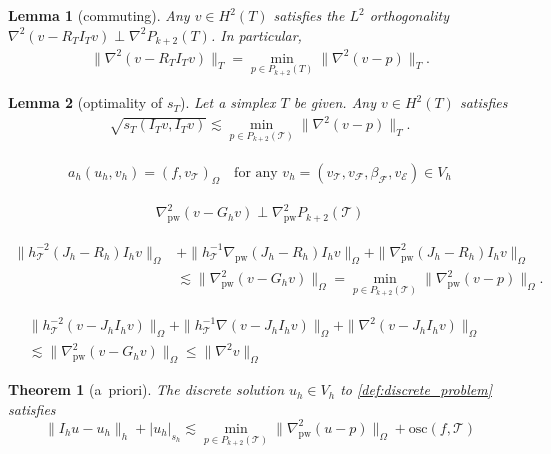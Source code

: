 \documentclass[10pt,a4paper]{amsart}
\newtheorem{lemma}{Lemma}
\newtheorem{theorem}{Theorem}
\def\E{\mathcal{E}}
\def\F{\mathcal{F}}
\def\T{\mathcal{T}}
\def\pw{\mathrm{pw}}
\begin{document}
\begin{lemma}[commuting]\label{lem:commuting}
    Any $v \in H^2(T)$ satisfies the $L^2$ orthogonality $\nabla^2 (v - R_T I_T v) \perp \nabla^2 P_{k+2}(T)$. In particular,
    \begin{align}\label{ineq:RI-best-appr}
        \|\nabla^2 (v - R_T I_T v)\|_T = \min_{p \in P_{k+2}(T)} \|\nabla^2 (v - p)\|_T.
    \end{align}
\end{lemma}

\begin{lemma}[optimality of $s_T$]\label{lem:best-appr-stab}
    Let a simplex $T$ be given. Any $v \in H^2(T)$ satisfies
    \begin{align*}
        \sqrt{s_T(I_T v, I_T v)} \lesssim \min_{p \in P_{k+2}(\T)} \|\nabla^2(v - p)\|_T.
    \end{align*}
\end{lemma}

\begin{align}\label{def:discrete_problem}
    a_h(u_h,v_h) = (f,v_\T)_\Omega \quad\text{for any } v_h = (v_\T, v_\F, \beta_\F, v_\E) \in V_h
\end{align}

\begin{align}\label{eq:commuting-G}
	\nabla_\pw^2(v - G_h v) \perp \nabla_\pw^2 P_{k+2}(\T)
\end{align}

	\begin{equation}\label{ineq:quasi-best-J-R}
    \begin{aligned}
        \|h_\T^{-2}(J_h - R_h) I_h v\|_\Omega &+ \|h_\T^{-1}\nabla_\pw(J_h - R_h) I_h v\|_\Omega + \|\nabla_\pw^2(J_h - R_h) I_h v\|_\Omega \\ & \lesssim \|\nabla_\pw^2(v - G_h v)\|_\Omega = \min_{p \in P_{k+2}(\T)} \|\nabla_\pw^2(v - p)\|_\Omega.
    \end{aligned}
	\end{equation}

	\begin{align}\label{ineq:quasi-interpolation}
		\|h_\T^{-2}(v - J_h I_h v)\|_\Omega + \|h_\T^{-1}\nabla (v - J_h I_h v)\|_\Omega + \|\nabla^2(v - J_h I_h v)\|_\Omega&\nonumber\\
		\lesssim \|\nabla_\pw^2(v - G_h v)\|_\Omega \leq \|\nabla^2 v\|_\Omega&
	\end{align}

\begin{theorem}[a~priori]\label{thm:a-priori}
    The discrete solution $u_h \in V_h$ to \eqref{def:discrete_problem} satisfies
    \begin{equation}\label{ineq:a-priori-thm}
        \|I_h u - u_h\|_{h} + |u_h|_{s_h} \lesssim \min_{p \in P_{k+2}(\mathcal{T})}\|\nabla^2_\pw(u - p)\|_{\Omega} + \mathrm{osc}(f,\mathcal{T})
    \end{equation}
\end{theorem}
\end{document}
